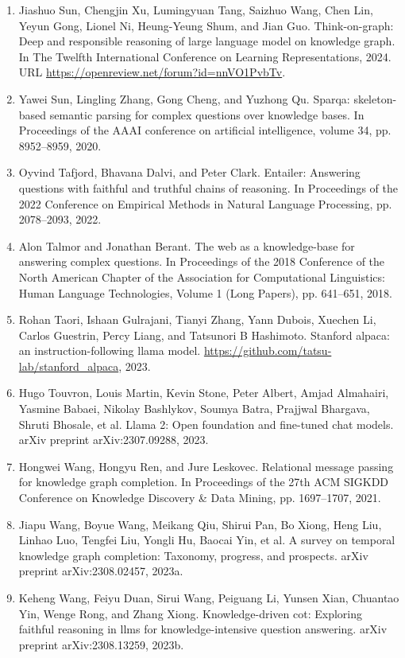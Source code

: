 \documentclass[11pt,UTF8,fontset=fandol]{ctexart}
\begin{document}
\begin{enumerate}[leftmargin=2em]
\item Jiashuo Sun, Chengjin Xu, Lumingyuan Tang, Saizhuo Wang, Chen Lin, Yeyun Gong, Lionel Ni, Heung-Yeung Shum, and Jian Guo. Think-on-graph: Deep and responsible reasoning of large language model on knowledge graph. In The Twelfth International Conference on Learning Representations, 2024. URL \url{https://openreview.net/forum?id=nnVO1PvbTv}.
\item Yawei Sun, Lingling Zhang, Gong Cheng, and Yuzhong Qu. Sparqa: skeleton-based semantic parsing for complex questions over knowledge bases. In Proceedings of the AAAI conference on artificial intelligence, volume 34, pp. 8952--8959, 2020.
\item Oyvind Tafjord, Bhavana Dalvi, and Peter Clark. Entailer: Answering questions with faithful and truthful chains of reasoning. In Proceedings of the 2022 Conference on Empirical Methods in Natural Language Processing, pp. 2078--2093, 2022.
\item Alon Talmor and Jonathan Berant. The web as a knowledge-base for answering complex questions. In Proceedings of the 2018 Conference of the North American Chapter of the Association for Computational Linguistics: Human Language Technologies, Volume 1 (Long Papers), pp. 641--651, 2018.
\item Rohan Taori, Ishaan Gulrajani, Tianyi Zhang, Yann Dubois, Xuechen Li, Carlos Guestrin, Percy Liang, and Tatsunori B Hashimoto. Stanford alpaca: an instruction-following llama model. \url{https://github.com/tatsu-lab/stanford_alpaca}, 2023.
\item Hugo Touvron, Louis Martin, Kevin Stone, Peter Albert, Amjad Almahairi, Yasmine Babaei, Nikolay Bashlykov, Soumya Batra, Prajjwal Bhargava, Shruti Bhosale, et al. Llama 2: Open foundation and fine-tuned chat models. arXiv preprint arXiv:2307.09288, 2023.
\item Hongwei Wang, Hongyu Ren, and Jure Leskovec. Relational message passing for knowledge graph completion. In Proceedings of the 27th ACM SIGKDD Conference on Knowledge Discovery \& Data Mining, pp. 1697--1707, 2021.
\item Jiapu Wang, Boyue Wang, Meikang Qiu, Shirui Pan, Bo Xiong, Heng Liu, Linhao Luo, Tengfei Liu, Yongli Hu, Baocai Yin, et al. A survey on temporal knowledge graph completion: Taxonomy, progress, and prospects. arXiv preprint arXiv:2308.02457, 2023a.
\item Keheng Wang, Feiyu Duan, Sirui Wang, Peiguang Li, Yunsen Xian, Chuantao Yin, Wenge Rong, and Zhang Xiong. Knowledge-driven cot: Exploring faithful reasoning in llms for knowledge-intensive question answering. arXiv preprint arXiv:2308.13259, 2023b.

\end{enumerate}
\end{document}
